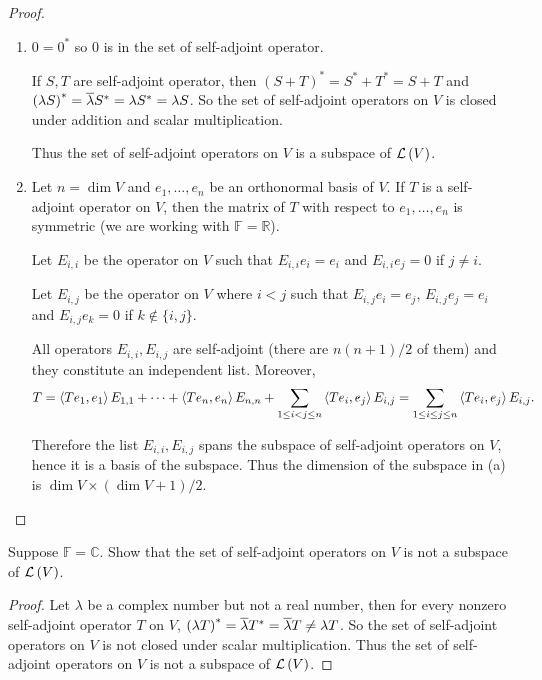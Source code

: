 \begin{proof}
    \begin{enumerate}[label={(\alph*)}]
        \item $0 = 0^{*}$ so $0$ is in the set of self-adjoint operator.

        If $S, T$ are self-adjoint operator, then ${(S + T)}^{*} = {S^{*} + T^{*}} = S + T$ and ${(\lambda S)}^{*} = \overline{\lambda}S^{*} = \lambda S^{*} = \lambda S$. So the set of self-adjoint operators on $V$ is closed under addition and scalar multiplication.

        Thus the set of self-adjoint operators on $V$ is a subspace of $\mathcal{L}\left({V}\right)$.
        \item Let $n = \dim V$ and $e_{1}, \ldots, e_{n}$ be an orthonormal basis of $V$. If $T$ is a self-adjoint operator on $V$, then the matrix of $T$ with respect to $e_{1}, \ldots, e_{n}$ is symmetric (we are working with $\mathbb{F} = \mathbb{R}$).

        Let $E_{i,i}$ be the operator on $V$ such that $E_{i,i}e_{i} = e_{i}$ and $E_{i,i}e_{j} = 0$ if $j\ne i$.

        Let $E_{i,j}$ be the operator on $V$ where $i<j$ such that $E_{i,j}e_{i} = e_{j}$, $E_{i,j}e_{j} = e_{i}$ and $E_{i,j}e_{k} = 0$ if $k\notin\{i, j\}$.

        All operators $E_{i,i}, E_{i,j}$ are self-adjoint (there are $n(n + 1)/2$ of them) and they constitute an independent list. Moreover,
        \[
            T = \left\langle{Te_{1}, e_{1}}\right\rangle E_{1,1} + \cdots + \left\langle{Te_{n}, e_{n}}\right\rangle E_{n,n} + \sum_{1\leq i < j\leq n}\left\langle{Te_{i}, e_{j}}\right\rangle E_{i, j} = \sum_{1\leq i\leq j\leq n}\left\langle{Te_{i}, e_{j}}\right\rangle E_{i,j}.
        \]

        Therefore the list $E_{i,i}, E_{i,j}$ spans the subspace of self-adjoint operators on $V$, hence it is a basis of the subspace. Thus the dimension of the subspace in (a) is $\dim V \times (\dim V + 1)/2$.
    \end{enumerate}
\end{proof}
\newpage

\begin{exercise}
    Suppose $\mathbb{F} = \mathbb{C}$. Show that the set of self-adjoint operators on $V$ is not a subspace of $\mathcal{L}\left({V}\right)$.
\end{exercise}

\begin{proof}
    Let $\lambda$ be a complex number but not a real number, then for every nonzero self-adjoint operator $T$ on $V$, ${(\lambda T)}^{*} = \overline{\lambda}T^{*} = \overline{\lambda}T \ne \lambda T$. So the set of self-adjoint operators on $V$ is not closed under scalar multiplication. Thus the set of self-adjoint operators on $V$ is not a subspace of $\mathcal{L}\left({V}\right)$.
\end{proof}
\newpage


